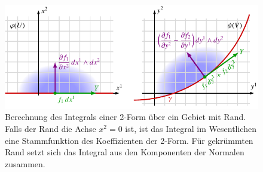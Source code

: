 %
%
%
\begin{figure}
\centering
\includegraphics{chapters/040-green/images/greenrand2d.pdf}
\caption{Berechnung des Integrals einer 2-Form über ein Gebiet mit Rand.
Falls der Rand die Achse $x^2=0$ ist, ist das Integral im Wesentlichen
eine Stammfunktion des Koeffizienten der 2-Form.
Für gekrümmten Rand setzt sich das Integral aus den Komponenten der
Normalen zusammen.
\label{buch:green:green:fig:greenrand2d}}
\end{figure}
